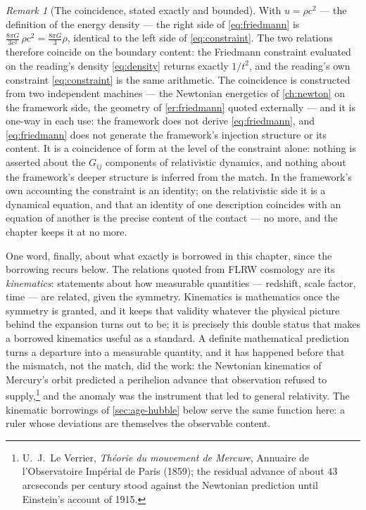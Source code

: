 \documentclass[11pt]{amsbook}
\theoremstyle{plain}
\theoremstyle{definition}
\theoremstyle{remark}
\newtheorem{remark}[theorem]{Remark}
\begin{document}
\begin{remark}[The coincidence, stated exactly and bounded]\label{rem:coincidence}
With $u = \rho c^{2}$ --- the definition of the energy density --- the right side of \cref{eq:friedmann} is $\frac{8\pi G}{3c^{2}}\,\rho c^{2} = \frac{8\pi G}{3}\rho$, identical to the left side of \cref{eq:constraint}. The two relations therefore coincide on the boundary content: the Friedmann constraint evaluated on the reading's density \cref{eq:density} returns exactly $1/t^{2}$, and the reading's own constraint \cref{eq:constraint} is the same arithmetic. The coincidence is constructed from two independent machines --- the Newtonian energetics of \cref{ch:newton} on the framework side, the geometry of \cref{er:friedmann} quoted externally --- and it is one-way in each use: the framework does not derive \cref{eq:friedmann}, and \cref{eq:friedmann} does not generate the framework's injection structure or its content. It is a coincidence of form at the level of the constraint alone: nothing is asserted about the $G_{ij}$ components of relativistic dynamics, and nothing about the framework's deeper structure is inferred from the match. In the framework's own accounting the constraint is an identity; on the relativistic side it is a dynamical equation, and that an identity of one description coincides with an equation of another is the precise content of the contact --- no more, and the chapter keeps it at no more.
\end{remark}

One word, finally, about what exactly is borrowed in this chapter, since the borrowing recurs below. The relations quoted from FLRW cosmology are its \emph{kinematics}: statements about how measurable quantities --- redshift, scale factor, time --- are related, given the symmetry. Kinematics is mathematics once the symmetry is granted, and it keeps that validity whatever the physical picture behind the expansion turns out to be; it is precisely this double status that makes a borrowed kinematics useful as a standard. A definite mathematical prediction turns a departure into a measurable quantity, and it has happened before that the mismatch, not the match, did the work: the Newtonian kinematics of Mercury's orbit predicted a perihelion advance that observation refused to supply,\footnote{U.~J.~Le Verrier, \emph{Th\'eorie du mouvement de Mercure}, Annuaire de l'Observatoire Imp\'erial de Paris (1859); the residual advance of about $43$ arcseconds per century stood against the Newtonian prediction until Einstein's account of 1915.} and the anomaly was the instrument that led to general relativity. The kinematic borrowings of \cref{sec:age-hubble} below serve the same function here: a ruler whose deviations are themselves the observable content.
\end{document}
